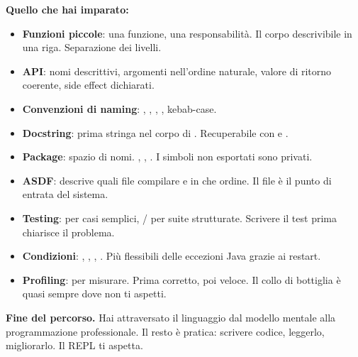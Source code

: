 \begin{tcolorbox}[
  enhanced,
  colback=csBlue!5, colframe=csBlue!40,
  arc=4pt, boxrule=0.6pt,
  left=14pt, right=14pt, top=12pt, bottom=12pt,
  before skip=16pt, after skip=16pt
]
\textbf{Quello che hai imparato:}

\medskip
\begin{itemize}
  \item \textbf{Funzioni piccole}: una funzione, una responsabilità.
        Il corpo descrivibile in una riga. Separazione dei livelli.
  \item \textbf{API}: nomi descrittivi, argomenti nell'ordine naturale,
        valore di ritorno coerente, side effect dichiarati.
  \item \textbf{Convenzioni di naming}: , \fn{!},
        , , kebab-case.
  \item \textbf{Docstring}: prima stringa nel corpo di .
        Recuperabile con  e .
  \item \textbf{Package}: spazio di nomi. ,
        , . I simboli non esportati
        sono privati.
  \item \textbf{ASDF}: descrive quali file compilare e in che ordine.
        Il file  è il punto di entrata del sistema.
  \item \textbf{Testing}:  per casi semplici,
        / per suite strutturate.
        Scrivere il test prima chiarisce il problema.
  \item \textbf{Condizioni}: , ,
        , .
        Più flessibili delle eccezioni Java grazie ai restart.
  \item \textbf{Profiling}:  per misurare. Prima corretto,
        poi veloce. Il collo di bottiglia è quasi sempre
        dove non ti aspetti.
\end{itemize}

\medskip
\textbf{Fine del percorso.}
Hai attraversato il linguaggio dal modello mentale alla
programmazione professionale.
Il resto è pratica: scrivere codice, leggerlo, migliorarlo.
Il REPL ti aspetta.
\end{tcolorbox}
